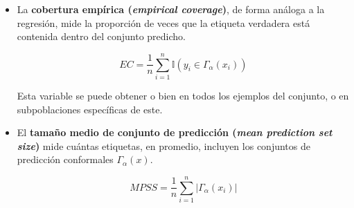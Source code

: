 \begin{itemize}

    \item La \textbf{cobertura empírica (\textit{empirical coverage})}, de forma análoga a la regresión, mide la proporción de veces que la etiqueta verdadera está contenida dentro del conjunto predicho.

    $$
    EC = \frac{1}{n} \sum_{i=1}^{n} \mathbb{I}(y_i \in \Gamma_\alpha(x_i))
    $$

    Esta variable se puede obtener o bien en todos los ejemplos del conjunto, o en subpoblaciones específicas de este.





    \item El \textbf{tamaño medio de conjunto de predicción (\textit{mean prediction set size})} mide cuántas etiquetas, en promedio, incluyen los conjuntos de predicción conformales $\Gamma_\alpha(x)$.

    $$
    MPSS = \frac{1}{n} \sum_{i=1}^n | \Gamma_\alpha(x_i) |
    $$


    
\end{itemize}


